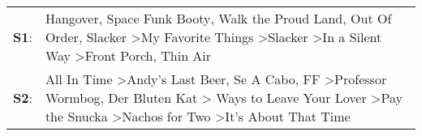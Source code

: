 \begin{supertabular}{p{0.03\textwidth}p{0.92\textwidth}}
 \textbf{S1}:  &                                                 Hangover\textsuperscript{}, \enspace Space Funk Booty\textsuperscript{}, \enspace Walk the Proud Land\textsuperscript{}, \enspace Out Of Order\textsuperscript{}, \enspace Slacker\textsuperscript{} \textgreater \enspace My Favorite Things\textsuperscript{} \textgreater \enspace Slacker\textsuperscript{} \textgreater \enspace In a Silent Way\textsuperscript{} \textgreater \enspace Front Porch\textsuperscript{}, \enspace Thin Air\textsuperscript{}  \enspace  \\
 \textbf{S2}:  &  All In Time\textsuperscript{} \textgreater \enspace Andy's Last Beer\textsuperscript{}, \enspace Se A Cabo\textsuperscript{}, \enspace FF\textsuperscript{} \textgreater \enspace Professor Wormbog\textsuperscript{}, \enspace Der Bluten Kat\textsuperscript{} \textgreater {} Ways to Leave Your Lover\textsuperscript{} \textgreater \enspace Pay the Snucka\textsuperscript{} \textgreater \enspace Nachos for Two\textsuperscript{} \textgreater \enspace It's About That Time\textsuperscript{}  \enspace  \\
\end{supertabular}
